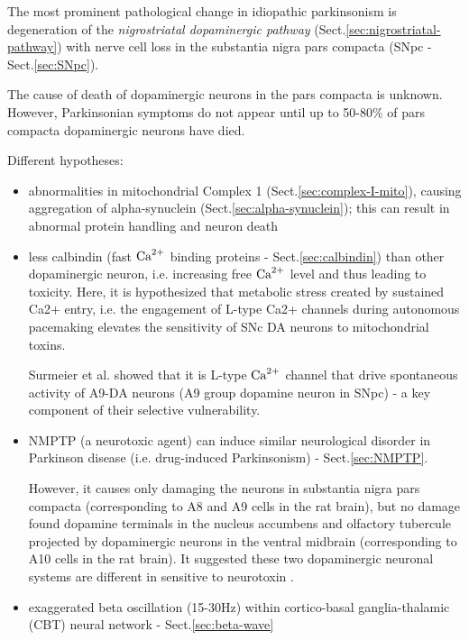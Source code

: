 The most prominent pathological change in idiopathic parkinsonism is
degeneration of the {\it nigrostriatal dopaminergic pathway}
(Sect.\ref{sec:nigrostriatal-pathway}) with nerve cell loss in the substantia
nigra pars compacta (SNpc - Sect.\ref{sec:SNpc}).


The cause of death of dopaminergic neurons in the pars compacta is unknown.
However, Parkinsonian symptoms do not appear until up to 50-80\% of pars
compacta dopaminergic neurons have died.

Different hypotheses:
\begin{itemize}
  
  \item abnormalities in mitochondrial Complex 1
  (Sect.\ref{sec:complex-I-mito}), causing aggregation of alpha-synuclein
  (Sect.\ref{sec:alpha-synuclein}); this can result in abnormal protein handling
  and neuron death
  
  \item less calbindin (fast ${\text{Ca}^{2+}}$ binding proteins - Sect.\ref{sec:calbindin})
  than other dopaminergic neuron, i.e.  increasing free ${\text{Ca}^{2+}}$ level and thus
  leading to toxicity. Here, it is hypothesized that metabolic stress created by
  sustained Ca2+ entry, i.e.
   the engagement of L-type Ca2+ channels during autonomous pacemaking elevates
  the sensitivity of SNc DA neurons to mitochondrial toxins.
    
  Surmeier et al. showed that it is L-type ${\text{Ca}^{2+}}$ channel that drive
  spontaneous activity of A9-DA neurons (A9 group dopamine neuron in SNpc) - a
  key component of their selective vulnerability. 
  
  
  \item NMPTP (a neurotoxic agent) can induce similar neurological disorder in
  Parkinson disease (i.e. drug-induced Parkinsonism) - Sect.\ref{sec:NMPTP}.
  
  However, it causes only damaging the neurons in substantia nigra pars compacta
  (corresponding to A8 and A9 cells in the rat brain), but no damage found
  dopamine terminals in the nucleus accumbens and olfactory tubercule projected by
  dopaminergic neurons in the ventral midbrain (corresponding to A10 cells in
  the rat brain).
  It suggested these two dopaminergic neuronal systems are different in
  sensitive to neurotoxin \citep{burns1983}.
  
   
  \item exaggerated beta oscillation (15-30Hz) within cortico-basal
  ganglia-thalamic (CBT) neural network - Sect.\ref{sec:beta-wave}
  
\end{itemize}

